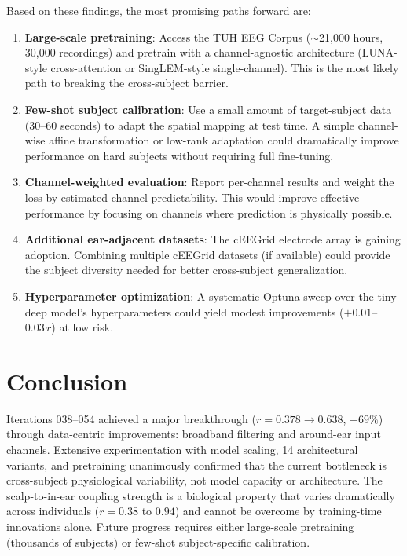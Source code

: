 \documentclass[11pt,a4paper]{article}
\begin{document}
Based on these findings, the most promising paths forward are:

\begin{enumerate}
  \item \textbf{Large-scale pretraining}: Access the TUH EEG Corpus
    ($\sim$21,000 hours, 30,000 recordings) and pretrain with a
    channel-agnostic architecture (LUNA-style cross-attention or
    SingLEM-style single-channel). This is the most likely path to
    breaking the cross-subject barrier.

  \item \textbf{Few-shot subject calibration}: Use a small amount of
    target-subject data (30--60 seconds) to adapt the spatial mapping
    at test time. A simple channel-wise affine transformation or
    low-rank adaptation could dramatically improve performance on hard
    subjects without requiring full fine-tuning.

  \item \textbf{Channel-weighted evaluation}: Report per-channel
    results and weight the loss by estimated channel predictability.
    This would improve effective performance by focusing on channels
    where prediction is physically possible.

  \item \textbf{Additional ear-adjacent datasets}: The cEEGrid electrode
    array is gaining adoption. Combining multiple cEEGrid datasets
    (if available) could provide the subject diversity needed for
    better cross-subject generalization.

  \item \textbf{Hyperparameter optimization}: A systematic Optuna sweep
    over the tiny deep model's hyperparameters could yield modest
    improvements ($+0.01$--$0.03\,r$) at low risk.
\end{enumerate}

\section{Conclusion}

Iterations 038--054 achieved a major breakthrough ($r = 0.378 \to 0.638$,
$+69\%$) through data-centric improvements: broadband filtering and
around-ear input channels. Extensive experimentation with model scaling,
14 architectural variants, and pretraining unanimously confirmed that the
current bottleneck is cross-subject physiological variability, not model
capacity or architecture. The scalp-to-in-ear coupling strength is a
biological property that varies dramatically across individuals
($r = 0.38$ to $0.94$) and cannot be overcome by training-time
innovations alone. Future progress requires either large-scale
pretraining (thousands of subjects) or few-shot subject-specific
calibration.
\end{document}
